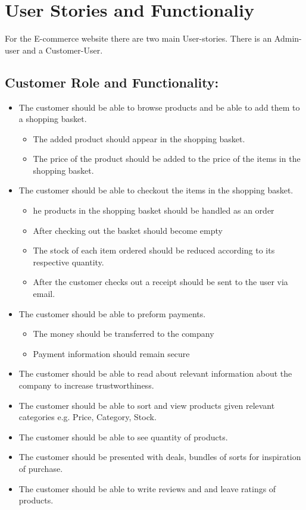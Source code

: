 \section{User Stories and Functionaliy}

For the E-commerce website there are two main User-stories. There is an Admin-user and a Customer-User.
\\
\subsection{Customer Role and Functionality:}
\begin{itemize}
    \item The customer should be able to browse products and be able to add them to a shopping basket. 
        \begin{itemize}
            \item The added product should appear in the shopping basket. 
            \item The price of the product should be added to the price of the items in the shopping basket.
        \end{itemize}
    \item The customer should be able to checkout the items in the shopping basket.
        \begin{itemize}
            \item he products in the shopping basket should be handled as an order
            
            \item After checking out the basket should become empty
            
            \item The stock of each item ordered should be reduced according to its respective quantity.
            
            \item After the customer checks out a receipt should be sent to the user via email. 
        \end{itemize}
    \item The customer should be able to preform payments. 
        \begin{itemize}
            \item The money should be transferred to the company
            \item Payment information should remain secure
        \end{itemize}
    \item The customer should be able to read about relevant information about the company to increase trustworthiness. 
    \item The customer should be able to sort and view  products given relevant categories e.g. Price, Category, Stock. 
    \item The customer should be able to see quantity of products. 
    \item The customer should be presented with deals, bundles of sorts for inspiration of purchase.
    \item The customer should be able to write reviews and and leave ratings of products. 
\end{itemize}

